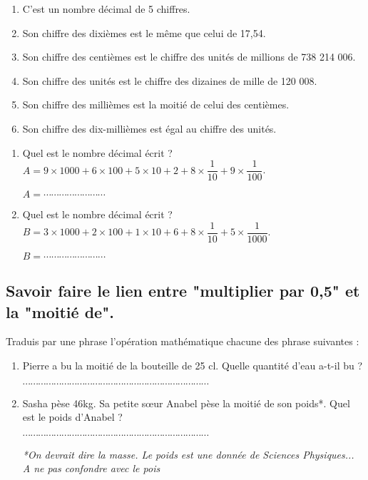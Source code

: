 \begin{enumerate}
\item C’est un nombre décimal de 5 chiffres.
\item  Son chiffre des dixièmes est le même que celui de 17,54.
\item  Son chiffre des centièmes est le chiffre des unités de millions de 738 214 006.
\item  Son chiffre des unités est le chiffre des dizaines de mille de 120 008.
\item  Son chiffre des millièmes est la moitié de celui des centièmes.
\item  Son chiffre des dix-millièmes est égal au chiffre des unités.
\end{enumerate}





\begin{enumerate}
\item Quel est le nombre décimal écrit ? $A = 9\times 1000 + 6\times 100 + 5\times 10 + 2 + 8\times \dfrac{1}{10} +  9\times \dfrac{1}{100} $.

$A = \cdots\cdots\cdots\cdots\cdots\cdots\cdots\cdots $

\item Quel est le nombre décimal écrit ? $B = 3\times 1000 + 2\times 100 + 1\times 10 + 6 + 8\times \dfrac{1}{10} +  5\times \dfrac{1}{1000} $.

$B = \cdots\cdots\cdots\cdots\cdots\cdots\cdots\cdots $
\end{enumerate}






\subsection{Savoir faire le lien entre "multiplier par 0,5" et la "moitié de".}



Traduis par une phrase l'opération mathématique chacune des phrase suivantes :
\begin{enumerate}
\item Pierre a bu la moitié de la bouteille de 25 cl. Quelle quantité d'eau a-t-il bu ?

$\cdots\cdots\cdots\cdots\cdots\cdots\cdots\cdots\cdots\cdots\cdots\cdots\cdots\cdots\cdots\cdots\cdots\cdots\cdots\cdots\cdots\cdots\cdots\cdots $

\item Sasha pèse 46kg. Sa petite sœur Anabel pèse la moitié de son poids*. Quel est le poids d'Anabel ?

$\cdots\cdots\cdots\cdots\cdots\cdots\cdots\cdots\cdots\cdots\cdots\cdots\cdots\cdots\cdots\cdots\cdots\cdots\cdots\cdots\cdots\cdots\cdots\cdots $

\textit{*On devrait dire la masse. Le poids est une donnée de Sciences Physiques... A ne pas confondre avec le pois}
\end{enumerate}



